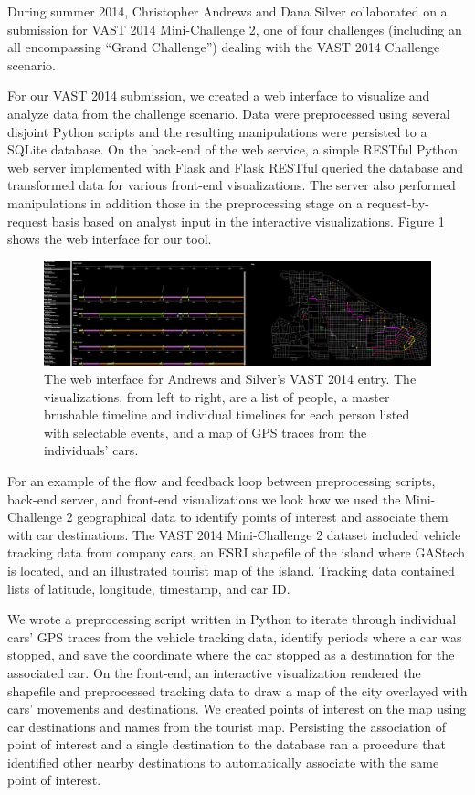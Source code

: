 \documentclass[midd]{thesis}
\begin{document}
During summer 2014, Christopher Andrews and Dana Silver collaborated on a
submission for VAST 2014 Mini-Challenge 2, one of four challenges (including an
all encompassing ``Grand Challenge'') dealing with the VAST 2014 Challenge
scenario.

For our VAST 2014 submission, we created a web interface to visualize and
analyze data from the challenge scenario. Data were preprocessed using several
disjoint Python scripts and the resulting manipulations were persisted to a
SQLite database. On the back-end of the web service, a simple RESTful Python web
server implemented with Flask \cite{flask} and Flask RESTful
\cite{flask-restful} queried the database and transformed data for various
front-end visualizations. The server also performed manipulations in addition
those in the preprocessing stage on a request-by-request basis based on analyst
input in the interactive visualizations. Figure \ref{fig:vast2014} shows the web
interface for our tool.

\begin{figure}[!ht]
  \centering
  \includegraphics[width=1\textwidth]{vast-mc2-2014-cropped-scaled}
  \caption{The web interface for Andrews and Silver's VAST 2014 entry. The
  visualizations, from left to right, are a list of people, a master brushable
  timeline and individual timelines for each person listed with selectable
  events, and a map of GPS traces from the individuals' cars.}
  \label{fig:vast2014}
\end{figure}

For an example of the flow and feedback loop between preprocessing scripts,
back-end server, and front-end visualizations we look how we used the
Mini-Challenge 2 geographical data to identify points of interest and associate
them with car destinations. The VAST 2014 Mini-Challenge 2 dataset included
vehicle tracking data from company cars, an ESRI shapefile of the island where
GAStech is located, and an illustrated tourist map of the island. Tracking data
contained lists of latitude, longitude, timestamp, and car ID.

We wrote a preprocessing script written in Python to iterate through individual
cars' GPS traces from the vehicle tracking data, identify periods where a car
was stopped, and save the coordinate where the car stopped as a destination for
the associated car. On the front-end, an interactive visualization rendered the
shapefile and preprocessed tracking data to draw a map of the city overlayed
with cars' movements and destinations. We created points of interest on the map
using car destinations and names from the tourist map. Persisting the
association of point of interest and a single destination to the database ran a
procedure that identified other nearby destinations to automatically associate
with the same point of interest.
\end{document}
